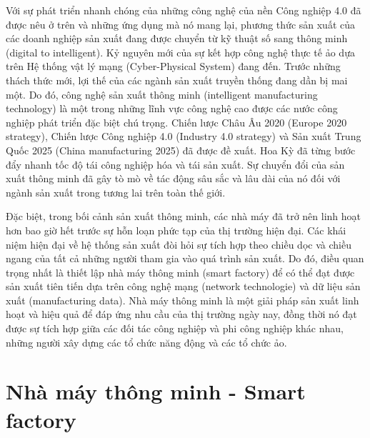 Với sự phát triển nhanh chóng của những công nghệ của nền Công nghiệp 4.0 đã được nêu ở trên và những ứng dụng mà nó mang lại, phương thức sản xuất của các doanh nghiệp sản xuất đang được chuyển từ kỹ thuật số sang thông minh (digital to intelligent). Kỷ nguyên mới của sự kết hợp công nghệ thực tế ảo dựa trên Hệ thống vật lý mạng (Cyber-Physical System) đang đến. Trước những thách thức mới, lợi thế của các ngành sản xuất truyền thống đang dần bị mai một. Do đó, công nghệ sản xuất thông minh (intelligent manufacturing technology) là một trong những lĩnh vực công nghệ cao được các nước công nghiệp phát triển đặc biệt chú trọng. Chiến lược Châu Âu 2020 (Europe 2020 strategy), Chiến lược Công nghiệp 4.0 (Industry 4.0 strategy) và Sản xuất Trung Quốc 2025 (China manufacturing 2025) đã được đề xuất. Hoa Kỳ đã từng bước đẩy nhanh tốc độ tái công nghiệp hóa và tái sản xuất. Sự chuyển đổi của sản xuất thông minh đã gây tò mò về tác động sâu sắc và lâu dài của nó đối với ngành sản xuất trong tương lai trên toàn thế giới.

Đặc biệt, trong bối cảnh sản xuất thông minh, các nhà máy đã trở nên linh hoạt hơn bao giờ hết trước sự hỗn loạn phức tạp của thị trường hiện đại. Các khái niệm hiện đại về hệ thống sản xuất đòi hỏi sự tích hợp theo chiều dọc và chiều ngang của tất cả những người tham gia vào quá trình sản xuất. Do đó, điều quan trọng nhất là thiết lập nhà máy thông minh (smart factory) để có thể đạt được sản xuất tiên tiến dựa trên công nghệ mạng (network technologie) và dữ liệu sản xuất (manufacturing data). Nhà máy thông minh là một giải pháp sản xuất linh hoạt và hiệu quả để đáp ứng nhu cầu của thị trường ngày nay, đồng thời nó đạt được sự tích hợp giữa các đối tác công nghiệp và phi công nghiệp khác nhau, những người xây dựng các tổ chức năng động và các tổ chức ảo.


\section{Nhà máy thông minh - Smart factory}


